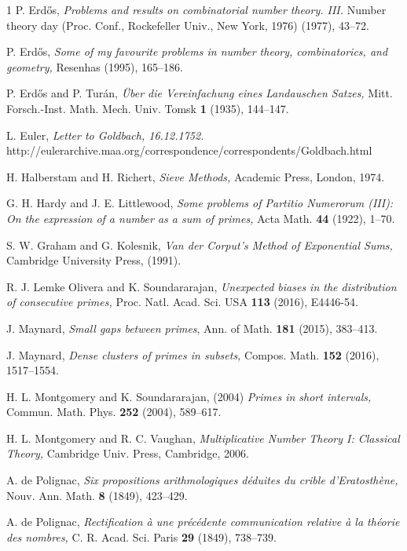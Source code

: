 \documentclass[12pt,a4paper,reqno]{amsart}
\numberwithin{equation}{section}
\theoremstyle{plain}
\theoremstyle{definition}
\begin{document}
\begin{thebibliography}{1}
P. Erd\H os, {\it Problems and results on combinatorial number theory. III.} Number theory day (Proc. Conf., Rockefeller Univ., New York, 1976) (1977), 43--72.

P. Erd\H os, {\it Some of my favourite problems in number theory, combinatorics, and geometry,}  Resenhas (1995), 165--186.

P. Erd\H os and P. Tur\'an, {\it \"Uber die Vereinfachung eines Landauschen Satzes,}  Mitt.
Forsch.-Inst. Math. Mech. Univ. Tomsk {\bf1} (1935), 144--147.

L. Euler, {\it Letter to Goldbach, 16.12.1752.} \\
http://eulerarchive.maa.org/correspondence/correspondents/Goldbach.html

H. Halberstam and H. Richert, {\it Sieve Methods,} Academic Press, London, 1974.

G. H. Hardy and J. E. Littlewood, {\it Some problems of Partitio Numerorum (III): On the expression of a
number as a sum of primes,} Acta Math. {\bf44} (1922), 1--70.

S. W. Graham and G. Kolesnik, {\it Van der Corput's Method of Exponential Sums,} Cambridge University Press, (1991).

R. J. Lemke Olivera and K. Soundararajan, {\it Unexpected biases in the distribution of
consecutive primes,} Proc. Natl. Acad. Sci. USA {\bf 113} (2016), E4446-54. 

J. Maynard, {\it Small gaps between primes}, Ann. of Math. {\bf 181} (2015), 383--413. 

J. Maynard, {\it Dense clusters of primes in subsets,} Compos. Math. {\bf 152} (2016), 1517--1554.

H. L. Montgomery and K. Soundararajan, (2004) {\it Primes in short intervals,} Commun. Math. Phys. {\bf252} (2004), 589--617.

H. L. Montgomery and R. C. Vaughan, {\it Multiplicative Number Theory I: Classical
Theory,} Cambridge Univ. Press, Cambridge, 2006.

A. de Polignac, {\it Six propositions arithmologiques d\'eduites du crible d'Eratosth\`ene,}  Nouv. Ann. Math. {\bf 8} (1849), 423--429.

A. de Polignac, {\it Rectification \`a une pr\'ec\'edente communication relative \`a la th\'eorie des nombres,} C. R. Acad. Sci. Paris {\bf29} (1849), 738--739.


\end{thebibliography}
\end{document}
